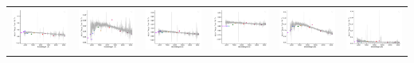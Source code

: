 \begin{center}
\begin{longtable}{l l l l l l }
    \includegraphics[width=0.3\linewidth, clip]{Figs/Figs-sdss/spec-1143-52592-0242-SPLUS-s02s08-040033.pdf} & \includegraphics[width=0.3\linewidth, clip]{Figs/Figs-sdss/spec-1144-53238-0450-STRIPE82-0138-042700.pdf} & \includegraphics[width=0.3\linewidth, clip]{Figs/Figs-sdss/spec-1152-52941-0144-STRIPE82-0123-036291.pdf} & \includegraphics[width=0.3\linewidth, clip]{Figs/Figs-sdss/spec-1152-52941-0599-STRIPE82-0123-045029.pdf} & \includegraphics[width=0.3\linewidth, clip]{Figs/Figs-sdss/spec-1474-52933-0180-STRIPE82-0129-037205.pdf} & \includegraphics[width=0.3\linewidth, clip]{Figs/Figs-sdss/spec-1474-52933-0189-STRIPE82-0129-024346.pdf} \\

\end{longtable}
\end{center}
